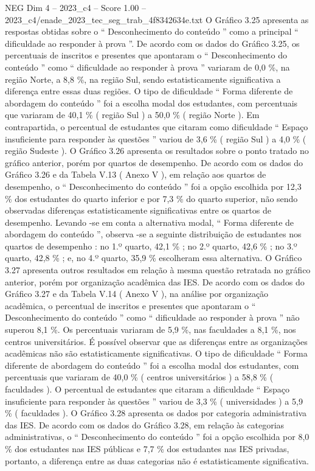 \begin{textsample}{NEG Dim 4 – 2023\_c4 – Score 1.00 – 2023\_c4/enade\_2023\_tec\_seg\_trab\_4f8342634e.txt}
O Gráfico 3.25 apresenta as respostas obtidas sobre o “ Desconhecimento do conteúdo ” como a principal “ dificuldade ao responder à prova ”.
De acordo com os dados do Gráfico 3.25, os percentuais de inscritos e presentes que apontaram o “ Desconhecimento do conteúdo ” como “ dificuldade ao responder à prova ” variaram de 0,0 \%, na região Norte, a 8,8 \%, na região Sul, sendo estatisticamente significativa a diferença entre essas duas regiões.
O tipo de dificuldade “ Forma diferente de abordagem do conteúdo ” foi a escolha modal dos estudantes, com percentuais que variaram de 40,1 \% ( região Sul ) a 50,0 \% ( região Norte ).
Em contrapartida, o percentual de estudantes que citaram como dificuldade “ Espaço insuficiente para responder às questões ” variou de 3,6 \% ( região Sul ) a 4,0 \% ( região Sudeste ).
O Gráfico 3.26 apresenta os resultados sobre o ponto tratado no gráfico anterior, porém por quartos de desempenho.
De acordo com os dados do Gráfico 3.26 e da Tabela V.13 ( Anexo V ), em relação aos quartos de desempenho, o “ Desconhecimento do conteúdo ” foi a opção escolhida por 12,3 \% dos estudantes do quarto inferior e por 7,3 \% do quarto superior, não sendo observadas diferenças estatisticamente significativas entre os quartos de desempenho.
Levando -se em conta a alternativa modal, “ Forma diferente de abordagem do conteúdo ”, observa -se a seguinte distribuição de estudantes nos quartos de desempenho : no 1.º quarto, 42,1 \% ; no 2.º quarto, 42,6 \% ; no 3.º quarto, 42,8 \% ; e, no 4.º quarto, 35,9 \% escolheram essa alternativa.
O Gráfico 3.27 apresenta outros resultados em relação à mesma questão retratada no gráfico anterior, porém por organização acadêmica das IES.
De acordo com os dados do Gráfico 3.27 e da Tabela V.14 ( Anexo V ), na análise por organização acadêmica, o percentual de inscritos e presentes que apontaram o “ Desconhecimento do conteúdo ” como “ dificuldade ao responder à prova ” não superou 8,1 \%.
Os percentuais variaram de 5,9 \%, nas faculdades a 8,1 \%, nos centros universitários.
É possível observar que as diferenças entre as organizações acadêmicas não são estatisticamente significativas.
O tipo de dificuldade “ Forma diferente de abordagem do conteúdo ” foi a escolha modal dos estudantes, com percentuais que variaram de 40,0 \% ( centros universitários ) a 58,8 \% ( faculdades ).
O percentual de estudantes que citaram a dificuldade “ Espaço insuficiente para responder às questões ” variou de 3,3 \% ( universidades ) a 5,9 \% ( faculdades ).
O Gráfico 3.28 apresenta os dados por categoria administrativa das IES.
De acordo com os dados do Gráfico 3.28, em relação às categorias administrativas, o “ Desconhecimento do conteúdo ” foi a opção escolhida por 8,0 \% dos estudantes nas IES públicas e 7,7 \% dos estudantes nas IES privadas, portanto, a diferença entre as duas categorias não é estatisticamente significativa.

\end{textsample}

